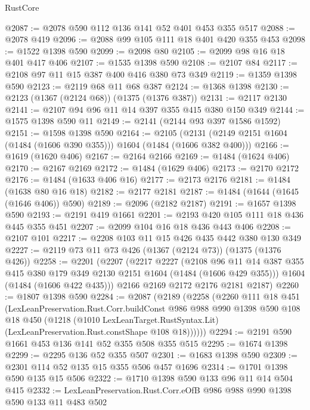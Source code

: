 \begin{lexlean}{RustCore}
\begin{coremodule}
@2087 := @2078 @590 @112 @136 @141 @52 @401 @453 @355 @517
@2088 := @2078 @419
@2096 := @2088 @99 @105 @111 @18 @401 @420 @355 @453
@2098 := @1522 @1398 @590
@2099 := @2098 @80
@2105 := @2099 @98 @16 @18 @401 @417 @406
@2107 := @1535 @1398 @590
@2108 := @2107 @84
@2117 := @2108 @97 @11 @15 @387 @400 @416 @380 @73 @349
@2119 := @1359 @1398 @590
@2123 := @2119 @68 @11 @68 @387
@2124 := @1368 @1398
@2130 := @2123 (@1367 (@2124 @68)) (@1375 (@1376 @387))
@2131 := @2117 @2130
@2141 := @2107 @94 @96 @11 @14 @397 @355 @415 @380 @150 @349
@2144 := @1575 @1398 @590 @11
@2149 := @2141 (@2144 @93 @397 @1586 @1592)
@2151 := @1598 @1398 @590
@2164 := @2105 (@2131 (@2149 @2151 @1604 (@1484 (@1606 @390 @355))) @1604 (@1484 (@1606 @382 @400)))
@2166 := @1619 (@1620 @406)
@2167 := @2164 @2166
@2169 := @1484 (@1624 @406)
@2170 := @2167 @2169
@2172 := @1484 (@1629 @406)
@2173 := @2170 @2172
@2176 := @1484 (@1633 @406 @16)
@2177 := @2173 @2176
@2181 := @1484 (@1638 @80 @16 @18)
@2182 := @2177 @2181
@2187 := @1484 (@1644 (@1645 (@1646 @406)) @590)
@2189 := @2096 (@2182 @2187)
@2191 := @1657 @1398 @590
@2193 := @2191 @419 @1661
@2201 := @2193 @420 @105 @111 @18 @436 @445 @355 @451
@2207 := @2099 @104 @16 @18 @436 @443 @406
@2208 := @2107 @101
@2217 := @2208 @103 @11 @15 @426 @435 @442 @380 @130 @349
@2227 := @2119 @73 @11 @73 @426 (@1367 (@2124 @73)) (@1375 (@1376 @426))
@2258 := @2201
    (@2207
      (@2217
        @2227
        (@2108
          @96
          @11
          @14
          @387
          @355
          @415
          @380
          @179
          @349
          @2130
          @2151
          @1604
          (@1484 (@1606 @429 @355)))
        @1604
        (@1484 (@1606 @422 @435)))
      @2166
      @2169
      @2172
      @2176
      @2181
      @2187)
@2260 := @1807 @1398 @590
@2284 := @2087
    (@2189
      (@2258
        (@2260
          @111
          @18
          @451
          (LexLeanPreservation.Rust.Corr.buildConst
            @986
            @988
            @990
            @1398
            @590
            @108
            @18
            @450
            (@1218
              (@1010 LexLeanTarget.RustSyntax.Lit)
              (LexLeanPreservation.Rust.constShape @108 @18))))))
@2294 := @2191 @590 @1661 @453 @136 @141 @52 @355 @508 @355 @515
@2295 := @1674 @1398
@2299 := @2295 @136 @52 @355 @507
@2301 := @1683 @1398 @590
@2309 := @2301 @114 @52 @135 @15 @355 @506 @457 @1696
@2314 := @1701 @1398 @590 @135 @15 @506
@2322 := @1710 @1398 @590 @133 @96 @11 @14 @504 @415
@2332 := LexLeanPreservation.Rust.Corr.eOfB @986 @988 @990 @1398 @590 @133 @11 @483 @502

\end{coremodule}
\end{lexlean}
